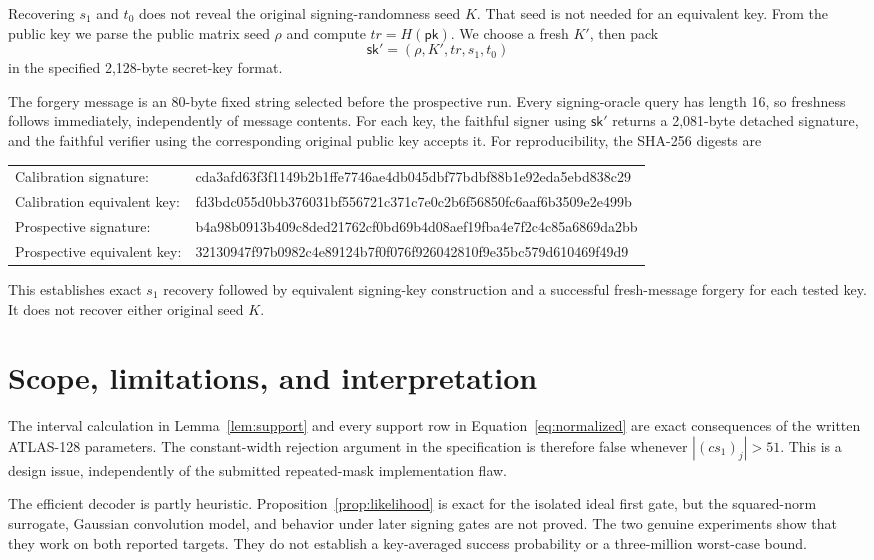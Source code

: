 \documentclass[11pt,a4paper]{article}
\newcommand{\pk}{\mathsf{pk}}
\newcommand{\sk}{\mathsf{sk}}
\newcommand{\ForgeryHash}{cda3afd63f3f1149b2b1ffe7746ae4db045dbf77bdbf88b1e92eda5ebd838c29}
\newcommand{\EquivalentKeyHash}{fd3bdc055d0bb376031bf556721c371c7e0c2b6f56850fc6aaf6b3509e2e499b}
\newcommand{\ProspectiveForgeryHash}{b4a98b0913b409c8ded21762cf0bd69b4d08aef19fba4e7f2c4c85a6869da2bb}
\newcommand{\ProspectiveEquivalentKeyHash}{32130947f97b0982c4e89124b7f0f076f926042810f9e35bc579d610469f49d9}
\begin{document}
Recovering $s_1$ and $t_0$ does not reveal the original signing-randomness
seed $K$.  That seed is not needed for an equivalent key.  From the public
key we parse the public matrix seed $\rho$ and compute
$\mathit{tr}=H(\pk)$.  We choose a fresh $K'$, then pack
\begin{equation}
                  \sk'=(\rho,K',\mathit{tr},s_1,t_0)
\label{eq:equivkey}
\end{equation}
in the specified 2,128-byte secret-key format.

The forgery message is an 80-byte fixed string selected before the prospective
run.  Every signing-oracle query has length 16, so freshness follows
immediately, independently of message contents.  For each key, the faithful
signer using $\sk'$ returns a 2,081-byte detached signature, and the faithful
verifier using the corresponding original public key accepts it.  For
reproducibility, the SHA-256 digests are
\begin{center}
\begin{tabular}{@{}ll@{}}
Calibration signature: & {\ttfamily\scriptsize \ForgeryHash}\\
Calibration equivalent key: & {\ttfamily\scriptsize \EquivalentKeyHash}\\
Prospective signature: & {\ttfamily\scriptsize \ProspectiveForgeryHash}\\
Prospective equivalent key: & {\ttfamily\scriptsize \ProspectiveEquivalentKeyHash}
\end{tabular}
\end{center}

This establishes exact $s_1$ recovery followed by equivalent signing-key
construction and a successful fresh-message forgery for each tested key.  It
does not recover either original seed $K$.

\section{Scope, limitations, and interpretation}
\label{sec:scope}

The interval calculation in Lemma~\ref{lem:support} and every support row in
Equation~\eqref{eq:normalized} are exact consequences of the written
ATLAS-128 parameters.  The constant-width rejection argument in the
specification is therefore false whenever $|(cs_1)_j|>51$.  This is a design
issue, independently of the submitted repeated-mask implementation flaw.

The efficient decoder is partly heuristic.  Proposition~\ref{prop:likelihood}
is exact for the isolated ideal first gate, but the squared-norm surrogate,
Gaussian convolution model, and behavior under later signing gates are not
proved.  The two genuine experiments show that they work on both reported
targets.
They do not establish a key-averaged success probability or a three-million
worst-case bound.
\end{document}
